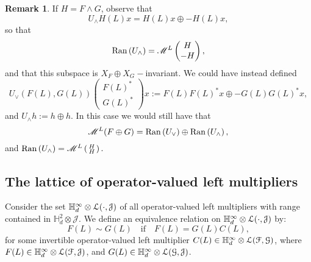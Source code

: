 \documentclass[11pt]{article}
\newcommand{\bpm}{\begin{pmatrix}}
\newcommand{\epm}{\end{pmatrix}}
\newcommand{\bsm}{\left ( \begin{smallmatrix}}
\newcommand{\esm}{\end{smallmatrix} \right) }
\newcommand{\scr}{\ensuremath{\mathscr}}
\newcommand{\mc}{\ensuremath{\mathcal}}
\def\bH{\mathbb{H}}
\def\cJ{\mathcal{J}}
\newcommand{\J}{\ensuremath{\mathcal{J} }}
\newcommand{\ran}[1]{\ensuremath{\mathrm{Ran} \left( {#1} \right) }}
\numberwithin{equation}{section}
\numberwithin{subsection}{section}
\theoremstyle{definition}
\newtheorem{remark}[subsection]{Remark}
\begin{document}
\begin{remark}
If $H = F \wedge G$, observe that 
$$ U_\wedge H(L) x = H(L) x \oplus -H(L) x, $$ so that 
$$ \ran{U_\wedge} = \scr{M} ^L \bpm H \\ - H \epm, $$ and that this subspace is $X_F \oplus X_G-$invariant. We could have instead defined
$$ U_\vee \left( F(L) , G(L) \right) \bpm F(L) ^* \\ G(L) ^* \epm x := F(L) F(L) ^* x \oplus - G(L) G(L) ^* x, $$ and $ U_\wedge h := h \oplus h.$ In this case we would still have that 
$$ \scr{M} ^L (F \oplus G) = \ran{U_\vee} \oplus \ran{U _\wedge}, $$ and 
$ \ran{U_\wedge} = \scr{M} ^L \bsm H \\ H \esm. $
\end{remark}


\subsection*{The lattice of operator-valued left multipliers}

Consider the set $\bH ^\infty _d \otimes \mc{L} ( \cdot, \cJ )$ of all operator-valued left multipliers with range contained in $\bH ^2 _d \otimes \J$. We define an equivalence relation on $\bH ^\infty _d \otimes \mc{L} (\cdot , \cJ )$ by: $$ F(L) \sim G(L) \quad \mbox{if} \quad F(L) = G(L) C(L), $$ for some invertible operator-valued left multiplier $C(L) \in \bH ^\infty _d \otimes \mc{L} (\mc{F}, \mc{G} )$, where $F (L) \in \bH ^\infty _d \otimes \mc{L} (\mc{F} , \mc{J} )$, and $G (L) \in \bH ^\infty _d \otimes \mc{L} (\mc{G} , \mc{J} )$.
\end{document}

